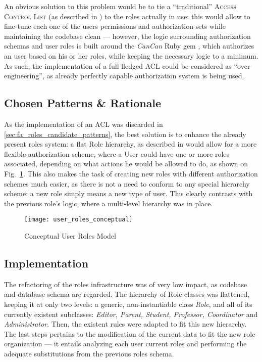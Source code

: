 An obvious solution to this problem would be to tie a ``traditional'' \textsc{Access Control List} (as described in \cite{}) to the roles actually in use: this would allow to fine-tune each one of the users permissions and authorization sets while maintaining the codebase clean --- however, the logic surrounding authorization schemas and user roles is built around the \emph{CanCan} Ruby gem \cite{cancan}, which authorizes an user based on his or her roles, while keeping the necessary logic to a minimum. As such, the implementation of a full-fledged ACL could be considered as ``over-engineering'', as already perfectly capable authorization system is being used.

\subsection{Chosen Patterns \& Rationale}\label{sec:fa_roles_chosen_patterns_rationale}

As the implementation of an ACL was discarded in \ref{sec:fa_roles_candidate_patterns}, the best solution is to enhance the already present roles system: a flat Role hierarchy, as described in \cite{baumer_riehle_role_object} would allow for a more flexible authorization scheme, where a User could have one or more roles associated, depending on what actions he would be allowed to do, as shown on Fig.~\ref{fig:user_roles_conceptual}. This also makes the task of creating new roles with different authorization schemes much easier, as there is not a need to conform to any special hierarchy scheme: a new role simply means a new type of user. This clearly contrasts with the previous role's logic, where a multi-level hierarchy was in place.

\begin{figure}[H]
  \centering
  \texttt{[image: user\_roles\_conceptual]}
  \caption{Conceptual User Roles Model}
  \label{fig:user_roles_conceptual}
\end{figure}

\subsection{Implementation}\label{sec:fa_roles_implementation}

The refactoring of the roles infrastructure was of very low impact, as codebase and database schema are regarded. The hierarchy of Role classes was flattened, keeping it at only two levels: a generic, non-instantiable class \emph{Role}, and all of its currently existent subclasses: \emph{Editor, Parent, Student, Professor, Coordinator} and \emph{Administrator}. Then, the existent rules were adapted to fit this new hierarchy. The last steps pertains to the modification of the current data to fit the new role organization --- it entails analyzing each user current roles and performing the adequate substitutions from the previous roles schema. 

